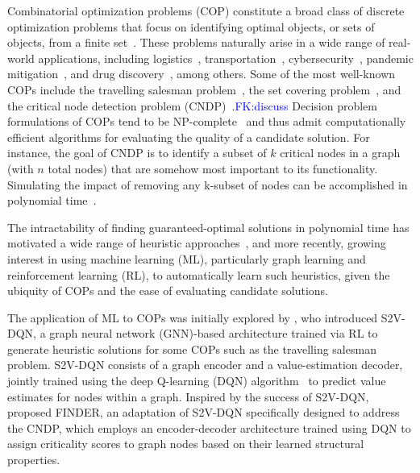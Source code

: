 \documentclass{article}
\newcommand{\fk}[1]{\textcolor{blue}{FK:#1}}
\begin{document}
Combinatorial optimization problems (COP) constitute a broad class of discrete optimization problems that focus on identifying optimal objects, or sets of objects, from a finite set~\cite{crescenzi1995compendium}. These problems naturally arise in a wide range of real-world applications, including logistics~\cite{yildiz2021express}, transportation~\cite{cappart2023combinatorial}, cybersecurity~\cite{nazir2021novel}, pandemic mitigation~\cite{khoshbakhtian2024optimal}, and drug discovery~\cite{kennedy2008application}, among others. Some of the most well-known COPs include the travelling salesman problem~\cite{gavish1978travelling}, the set covering problem~\cite{caprara2000algorithms}, and the critical node detection problem (CNDP)~\cite{ventresca2014derandomized}.\fk{discuss} Decision problem formulations of COPs tend to be NP-complete~\cite{karp2010reducibility} and thus admit computationally efficient algorithms for evaluating the quality of a candidate solution. For instance, the goal of CNDP is to identify a subset of $k$ critical nodes in a graph (with $n$ total nodes) that are somehow most important to its functionality. Simulating the impact of removing any k-subset of nodes can be accomplished in polynomial time~\cite{fan2020finding}.


The intractability of finding guaranteed-optimal solutions in polynomial time has motivated a wide range of heuristic approaches~\cite{misevivcius2004overview}, and more recently, growing interest in using machine learning (ML), particularly graph learning and reinforcement learning (RL), to automatically learn such heuristics, given the ubiquity of COPs and the ease of evaluating candidate solutions.

The application of ML to COPs was initially explored by \citet{khalil2017learning}, who introduced S2V-DQN, a graph neural network (GNN)-based architecture trained via RL to generate heuristic solutions for some COPs such as the travelling salesman problem. S2V-DQN consists of a graph encoder and a value-estimation decoder, jointly trained using the deep Q-learning (DQN) algorithm~\cite{mnih2015human} to predict value estimates for nodes within a graph. Inspired by the success of S2V-DQN, \citet{fan2020finding} proposed FINDER, an adaptation of S2V-DQN specifically designed to address the CNDP, which employs an encoder-decoder architecture trained using DQN to assign criticality scores to graph nodes based on their learned structural properties.
\end{document}
